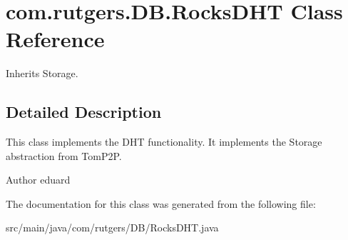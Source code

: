 \hypertarget{classcom_1_1rutgers_1_1DB_1_1RocksDHT}{}\section{com.\+rutgers.\+D\+B.\+Rocks\+D\+HT Class Reference}
\label{classcom_1_1rutgers_1_1DB_1_1RocksDHT}


Inherits Storage.



\subsection{Detailed Description}
This class implements the D\+HT functionality. It implements the Storage abstraction from Tom\+P2P.

\begin{DoxyAuthor}{Author}
eduard 
\end{DoxyAuthor}


The documentation for this class was generated from the following file\+:\begin{DoxyCompactItemize}
\item 
src/main/java/com/rutgers/\+D\+B/Rocks\+D\+H\+T.\+java\end{DoxyCompactItemize}
